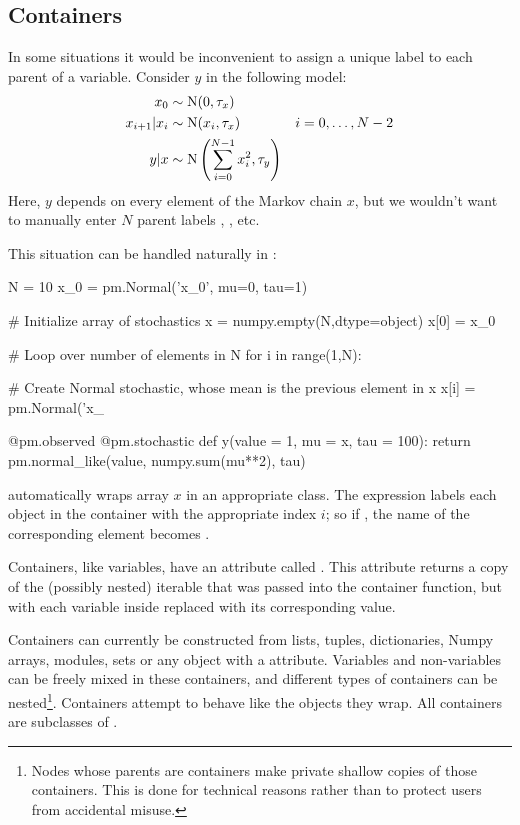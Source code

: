 \documentclass[]{jss}
\begin{document}
\subsection{Containers} \label{container}

In some situations it would be inconvenient to assign a unique label to each parent of a variable. Consider $y$ in the following model:
\begin{align*}
    x_0 &\sim \textup N (0,\tau_x)\\
    x_{i+1}|x_i &\sim \textup{N}(x_i, \tau_x)
    &i=0,\ldots, N-2\\
    y|x &\sim \textup N \left(\sum_{i=0}^{N-1}x_i^2,\tau_y\right)
\end{align*}
Here, $y$ depends on every element of the Markov chain $x$, but we wouldn't want to manually enter $N$ parent labels , , etc.

This situation can be handled naturally in :
\begin{CodeInput}
N = 10
x_0 = pm.Normal('x_0', mu=0, tau=1)

# Initialize array of stochastics
x = numpy.empty(N,dtype=object)
x[0] = x_0

# Loop over number of elements in N
for i in range(1,N):

# Create Normal stochastic, whose mean is the previous element in x
x[i] = pm.Normal('x_%

@pm.observed
@pm.stochastic
def y(value = 1, mu = x, tau = 100):
return pm.normal_like(value, numpy.sum(mu**2), tau)
\end{CodeInput}
 automatically wraps array $x$ in an appropriate  class. The  expression  labels each  object in the container with the appropriate index $i$; so if , the name of the corresponding element becomes .

Containers, like variables, have an attribute called . This attribute returns a copy of the (possibly nested) iterable that was passed into the container function, but with each variable inside replaced with its corresponding value.

Containers can currently be constructed from lists, tuples, dictionaries, Numpy arrays, modules, sets or any object with a  attribute. Variables and non-variables can be freely mixed in these containers, and different types of containers can be nested\footnote{Nodes whose parents are containers make private shallow copies of those containers. This is done for technical reasons rather than to protect users from accidental misuse.}. Containers attempt to behave like the objects they wrap. All containers are subclasses of .
\end{document}
